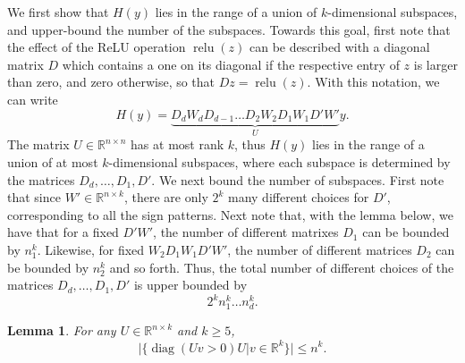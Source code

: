 \documentclass[11pt]{article}
\newtheorem{lemma}[theorem]{Lemma}
\DeclareMathOperator{\relu}{relu}
\DeclareMathOperator{\diag}{diag}
\newcommand{\Tnorm}{}
\newcommand\norm[2][\Tnorm]{\ensuremath{{\left\|#2\right\|}_{#1}}}
\newcommand\reals{\mathbb R}
\newcommand{\PS}{P_S}
\begin{document}
We first show that $H(y)$ lies in the range of a union of $k$-dimensional subspaces, and upper-bound the number of the subspaces. Towards this goal, first note that the effect of the ReLU operation $\relu(z)$ can be described with a diagonal matrix $D$ which contains a one on its diagonal if the respective entry of $z$ is larger than zero, and zero otherwise, so that $D z = \relu(z)$. With this notation, we can write
\[
H(y) 
= 
\underbrace{D_d W_d D_{d-1} \ldots D_2 W_2 D_1 W_1 D' W'}_{U} y.
\]
The matrix $U \in \reals^{n\times n}$ has at most rank $k$, thus $H(y)$ lies in the range of a union of at most $k$-dimensional subspaces, where each subspace is determined by the matrices $D_d,\ldots, D_1,D'$.
We next bound the number of subspaces.
First note that since $W' \in \reals^{n\times k}$, there are only $2^k$ many different choices for $D'$, corresponding to all the sign patterns.
Next note that, with the lemma below, we have that for a fixed $D' W'$, the number of different matrixes $D_1$ can be bounded by $n_1^k$. Likewise, for fixed 
$W_2 D_1 W_1 D' W'$, the number of different matrices $D_2$ can be bounded by $n_2^k$ and so forth. 
Thus, the total number of different choices of the matrices $D_d,\ldots, D_1,D'$ is upper bounded by
\[
2^k n_1^k \ldots n_d^k.
\]

\begin{lemma}
\label{lem:signpatterns}
For any $U \in \reals^{n\times k}$ and $k\geq 5$,
\[
| \{ \diag(U v > 0) U | v \in \reals^k \} |
\leq 
n^{k}.
\]
\end{lemma}

\end{document}
